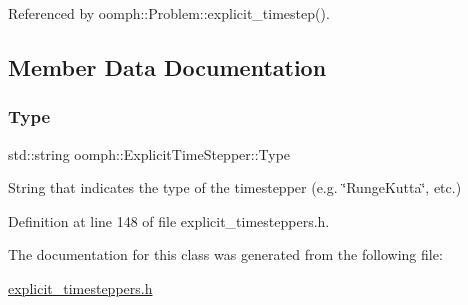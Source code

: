 Referenced by oomph\+::\+Problem\+::explicit\+\_\+timestep().



\subsection{Member Data Documentation}
\mbox{\label{classoomph_1_1ExplicitTimeStepper_aa923e120e84dc7cec56d2a50f5b33421}} 
\subsubsection{\texorpdfstring{Type}{Type}}
{\footnotesize\ttfamily std\+::string oomph\+::\+Explicit\+Time\+Stepper\+::\+Type\hspace{0.3cm}{\ttfamily [protected]}}



String that indicates the type of the timestepper (e.\+g. \char`\"{}\+Runge\+Kutta\char`\"{}, etc.) 



Definition at line 148 of file explicit\+\_\+timesteppers.\+h.



The documentation for this class was generated from the following file\+:\begin{DoxyCompactItemize}
\item 
\hyperlink{explicit__timesteppers_8h}{explicit\+\_\+timesteppers.\+h}\end{DoxyCompactItemize}
